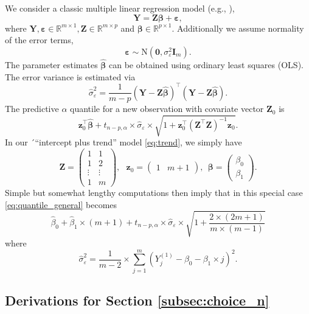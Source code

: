 \documentclass[12pt]{article}
\begin{document}
We consider a classic multiple linear regression model (e.g., \citealt{Fahrmeir2013}),
$$
\mathbf{Y} = \mathbf{Z}\boldsymbol{\beta} + \boldsymbol{\varepsilon},
$$
where $\mathbf{Y}, \boldsymbol{\varepsilon} \in \mathbb{R}^{m\times 1}, \mathbf{Z}\in \mathbb{R}^{m \times p}$ and $\boldsymbol{\beta} \in \mathbb{R}^{p \times 1}$. Additionally we assume normality of the error terms,
$$
\boldsymbol{\varepsilon} \sim \text{N}(\boldsymbol{0}, \sigma^2_\varepsilon \mathbf{I}_m).
$$
The parameter estimates $\hat{\boldsymbol{\beta}}$ can be obtained using ordinary least squares (OLS). The error variance is estimated via
$$
\hat{\sigma}^2_\varepsilon = \frac{1}{m - p} (\mathbf{Y} - \mathbf{Z}\hat{\boldsymbol{\beta}})^\top (\mathbf{Y} - \mathbf{Z}\hat{\boldsymbol{\beta}}).
$$
The predictive $\alpha$ quantile for a new observation with covariate vector $\mathbf{Z}_0$ is
\begin{equation}
\mathbf{z}_0^\top\hat{\boldsymbol{\beta}} + t_{n - p, \alpha} \times \hat{\sigma}_\varepsilon\times \sqrt{1 + \mathbf{z}_0^\top (\mathbf{Z}^\top\mathbf{Z})^{-1} \mathbf{z}_0}.\label{eq:quantile_general}
\end{equation}
In our ´``intercept plus trend'' model \eqref{eq:trend}, we simply have
$$
\mathbf{Z} = \left( \begin{array}{cc}
1 & 1\\
1 & 2\\
\vdots & \vdots\\
1 & m
\end{array}\right),\ \ \ \mathbf{z}_0 = \left( \begin{array}{cc}
1 & m + 1
\end{array}\right), \ \ 
\boldsymbol{\beta} = \left( \begin{array}{c}
\beta_0 \\ \beta_1
\end{array}\right).
$$
Simple but somewhat lengthy computations then imply that in this special case \eqref{eq:quantile_general} becomes
\begin{equation}
\hat{\beta}_0 + \hat{\beta}_1 \times (m + 1) + t_{n - p, \alpha} \times \hat{\sigma}_\varepsilon\times \sqrt{1 + \frac{2\times(2m + 1)}{m\times (m - 1)}}
\end{equation}
where
$$
\hat{\sigma}^2_\varepsilon = \frac{1}{m - 2} \times \sum_{j = 1}^m \left(Y^{(1)}_j - \beta_0 - \beta_1 \times j\right)^2.
$$

\subsection{Derivations for Section \ref{subsec:choice_n}}
\label{appendix:derivation_n}
\end{document}
